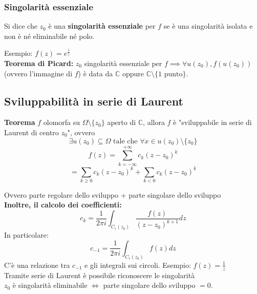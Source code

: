 \documentclass[a4paper]{article}
\newcommand{\C}{\mathbb{C}}
\begin{document}
\subsubsection{Singolarità essenziale}
\begin{tcolorbox}
	Si dice che $z_0$ è una \textbf{singolarità essenziale} per $f$ se è una singolarità isolata e non è né eliminabile né polo.
\end{tcolorbox}
Esempio: $f(z)=e^{\frac{1}{z}}$
\\\textbf{Teorema di Picard: }$z_0$ singolarità essenziale per $f\implies \forall u(z_0),f(u(z_0))$ (ovvero l'immagine di $f$) è data da $\C$ oppure $\C\setminus \{1 \text{ punto}\}$.
\subsection{Sviluppabilità in serie di Laurent}
\begin{tcolorbox}
	\textbf{Teorema} $f$ olomorfa su $\Omega\setminus \{z_0\} $ aperto di $\C$, allora $f$ è "sviluppabile in serie di Laurent di centro $z_0$", ovvero
	\[\exists u(z_0)\subseteq  \Omega \text{ tale che }\forall x\in u(z_0)\setminus \{z_0\} \]
	\[f(z)=\sum_{k=-\infty}^{+\infty} c_k(z-z_0)^k\]
	\[=\sum_{k\ge 0}^{} c_k(z-z_0)^k+\sum_{k<0}^{} c_k(z-z_0)^k\]
\end{tcolorbox}
Ovvero parte regolare dello sviluppo + parte singolare dello sviluppo
\\\textbf{Inoltre, il calcolo dei coefficienti:} 
\[c_k=\frac{1}{2\pi i}\int_{C_r(z_0)}^{} \frac{f(z)}{(z-z_0)^{k+1}}dz\] 
In particolare:
\[c_{-1}=\frac{1}{2\pi i}\int_{C_r(z_0)}^{} f(z)dz\]
C'è una relazione tra $c_{-1}$ e gli integrali sui circoli.
Esempio: $f(z)=\frac{1}{z}$
\\Tramite serie di Laurent è possibile riconoscere le singolarità
\\$z_0$ è singolarità eliminabile $\iff$ parte singolare dello sviluppo $=0$.
\end{document}
